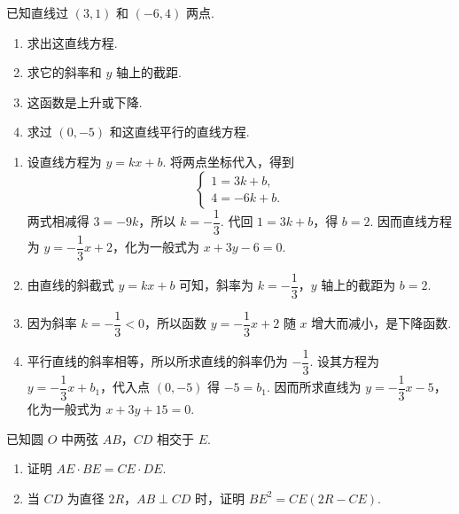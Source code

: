\begin{problem}
已知直线过 \((3,1)\) 和 \((-6,4)\) 两点.

\begin{enumerate}
    \item 求出这直线方程.
    \item 求它的斜率和 \(y\) 轴上的截距.
    \item 这函数是上升或下降.
    \item 求过 \((0,-5)\) 和这直线平行的直线方程.
\end{enumerate}
\end{problem}

\begin{solution}
\begin{enumerate}
\item 设直线方程为 \(y=kx+b\). 将两点坐标代入，得到
\[
\begin{cases}
1=3k+b,\\
4=-6k+b.
\end{cases}
\]
两式相减得 \(3=-9k\)，所以 \(k=-\dfrac13\). 代回 \(1=3k+b\)，得 \(b=2\). 因而直线方程为 \(y=-\dfrac13x+2\)，化为一般式为 \(x+3y-6=0\).

\item 由直线的斜截式 \(y=kx+b\) 可知，斜率为 \(k=-\dfrac13\)，\(y\) 轴上的截距为 \(b=2\).

\item 因为斜率 \(k=-\dfrac13<0\)，所以函数 \(y=-\dfrac13x+2\) 随 \(x\) 增大而减小，是下降函数.

\item 平行直线的斜率相等，所以所求直线的斜率仍为 \(-\dfrac13\). 设其方程为 \(y=-\dfrac13x+b_1\)，代入点 \((0,-5)\) 得 \(-5=b_1\). 因而所求直线为 \(y=-\dfrac13x-5\)，化为一般式为 \(x+3y+15=0\).
\end{enumerate}
\end{solution}

\begin{problem}
已知圆 \(O\) 中两弦 \(AB\)，\(CD\) 相交于 \(E\).

\begin{enumerate}
    \item 证明 \(AE\cdot BE=CE\cdot DE\).
    \item 当 \(CD\) 为直径 \(2R\)，\(AB\perp CD\) 时，证明 \(BE^2=CE(2R-CE)\).
\end{enumerate}

\end{problem}

